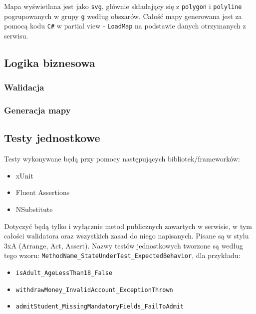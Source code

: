 \documentclass[a4paper, 10pt, titlepage]{article}
\newcommand{\code}[1]{\texttt{#1}}
\begin{document}
Mapa wyświetlana jest jako \code{svg}, głównie składający się z \code{polygon} i \code {polyline} pogrupowanych w grupy \code{g} według obszarów.
Całość mapy generowana jest za pomocą kodu \code{C\#} w partial view - \code{LoadMap} na podstawie danych otrzymanych z serwisu.

\subsection{Logika biznesowa}

\subsubsection{Walidacja}

\subsubsection{Generacja mapy}

\subsection{Testy jednostkowe}

Testy wykonywane będą przy pomocy następujących bibliotek/frameworków:

\begin{itemize}
\item xUnit
\item Fluent Assertions
\item NSubstitute
\end{itemize}

Dotyczyć będą tylko i wyłącznie metod publicznych zawartych w serwisie, w tym całości walidatora oraz wszystkich zasad do niego napisanych.
Pisane są w stylu 3xA (Arrange, Act, Assert).
Nazwy testów jednostkowych tworzone są według tego wzoru: \code{MethodName\_StateUnderTest\_ExpectedBehavior}, dla przykładu:
\begin{itemize}
\item \code{isAdult\_AgeLessThan18\_False}
\item \code{withdrawMoney\_InvalidAccount\_ExceptionThrown}
\item \code{admitStudent\_MissingMandatoryFields\_FailToAdmit}
\end{itemize}
\end{document}
